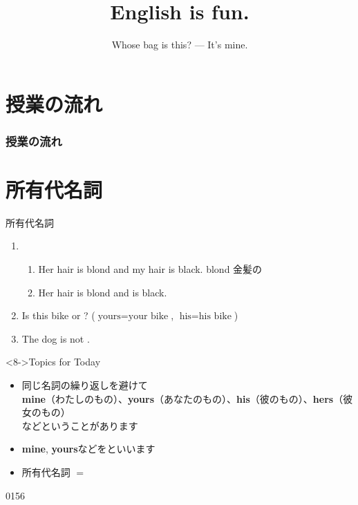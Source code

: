 \documentclass[aspectratio=169,xcolor={dvipsnames,table}]{beamer}
\title{English is fun.}
\subtitle{Whose bag is this? --- It's mine.}
\author{}
\institute[]{}
\date[]
\begin{document}
\begin{frame}[plain]
  \titlepage
\end{frame}

\section*{授業の流れ}
\begin{frame}[plain]
  \frametitle{授業の流れ}
  \tableofcontents
\end{frame}
\section{所有代名詞}
\begin{frame}[plain]{所有代名詞}
 
\begin{enumerate}
 \item<1-> \begin{enumerate}
	\item<1-> Her hair is blond and my hair is black.%
\hfill{}{\scriptsize blond  金髪の}
	\item<2-> Her hair is blond and  is black. \visible<3->{($\text{mine} = \text{my hair}$)}
       \end{enumerate}
 \item<4-> Is this bike  or ?  {($\text{yours} = \text{your bike}$, $\text{his} = \text{his bike}$)}
 \item<6-> The dog is not . 
\end{enumerate}

\vfill

\begin{block}<8->{Topics for Today}
\pause
\begin{itemize}[square]\small
 \item 同じ名詞の繰り返しを避けて\\
\textbf{mine}（わたしのもの）、\textbf{yours}（あなたのもの）、\textbf{his}（彼のもの）、\textbf{hers}（彼女のもの）\\
などということがあります
 \item \textbf{mine}, \textbf{yours}などをといいます
\item 所有代名詞 $=$ 
\end{itemize}
     \end{block}

\hfill{\tiny 0156}\,{\scriptsize {}}

\end{frame}
\end{document}
